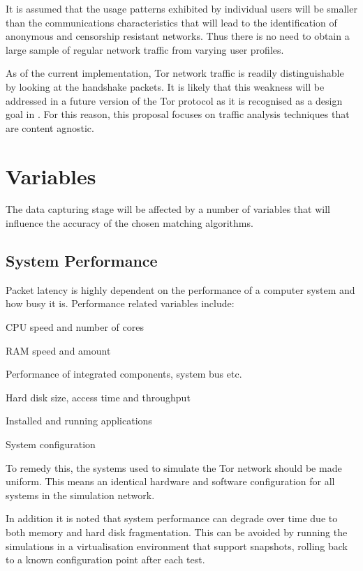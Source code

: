 \documentclass{ecuthesis}
\begin{document}
It is assumed that the usage patterns exhibited by individual users will be smaller than the communications characteristics that will lead to the identification of anonymous and censorship resistant networks. Thus there is no need to obtain a large sample of regular network traffic from varying user profiles.

As of the current implementation, Tor network traffic is readily distinguishable by looking at the handshake packets. It is likely that this weakness will be addressed in a future version of the Tor protocol as it is recognised as a design goal in \cite{Dingledine:2008p1542}. For this reason, this proposal focuses on traffic analysis techniques that are content agnostic.

\section{Variables}

The data capturing stage will be affected by a number of variables that will influence the accuracy of the chosen matching algorithms.

\subsection{System Performance}

Packet latency is highly dependent on the performance of a computer system  and how busy it is. Performance related variables include:

\begin{itemize*}
\item CPU speed and number of cores
\item RAM speed and amount
\item Performance of integrated components, system bus etc.
\item Hard disk size, access time and throughput
\item Installed and running applications
\item System configuration
\end{itemize*}

To remedy this, the systems used to simulate the Tor network should be made uniform. This means an identical hardware and software configuration for all systems in the simulation network.

In addition it is noted that system performance can degrade over time due to both memory and hard disk fragmentation. This can be avoided by running the simulations in a virtualisation environment that support snapshots, rolling back to a known configuration point after each test.
\end{document}
